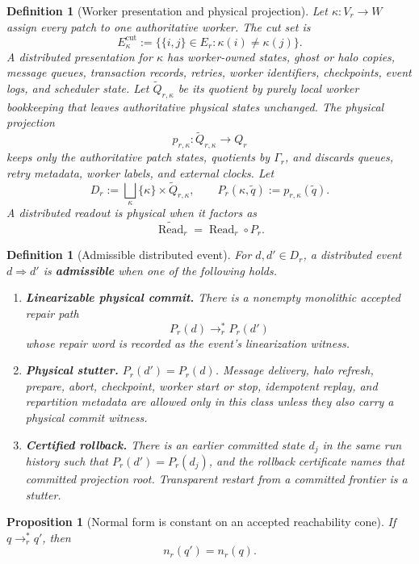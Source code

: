 \documentclass[11pt]{article}
\newtheorem{definition}[theorem]{Definition}
\newtheorem{proposition}[theorem]{Proposition}
\theoremstyle{remark}
\theoremstyle{plain}
\begin{document}
\begin{definition}[Worker presentation and physical projection]\label{def:worker-presentation}
Let \(\kappa:V_r\to W\) assign every patch to one authoritative worker. The cut set is
\[
E_\kappa^{\mathrm{cut}}
:=
\bigl\{\{i,j\}\in E_r:\kappa(i)\ne\kappa(j)\bigr\}.
\]
A distributed presentation for \(\kappa\) has worker-owned states, ghost or halo copies,
message queues, transaction records, retries, worker identifiers, checkpoints, event logs, and
scheduler state. Let \(\widetilde Q_{r,\kappa}\) be its quotient by purely local worker
bookkeeping that leaves authoritative physical states unchanged. The physical projection
\[
p_{r,\kappa}:\widetilde Q_{r,\kappa}\to Q_r
\]
keeps only the authoritative patch states, quotients by \(\Gamma_r\), and discards queues, retry
metadata, worker labels, and external clocks. Let
\[
D_r:=\bigsqcup_{\kappa}\{\kappa\}\times\widetilde Q_{r,\kappa},
\qquad
P_r(\kappa,\tilde q):=p_{r,\kappa}(\tilde q).
\]
A distributed readout is physical when it factors as
\[
\widetilde{\operatorname{Read}}_r=\operatorname{Read}_r\circ P_r.
\]
\end{definition}

\begin{definition}[Admissible distributed event]\label{def:admissible-distributed-event}
For \(d,d'\in D_r\), a distributed event \(d\Rightarrow d'\) is \textbf{admissible} when one of
the following holds.
\begin{enumerate}[label=(\alph*),leftmargin=2em]
\item \textbf{Linearizable physical commit.} There is a nonempty monolithic accepted repair path
\[
P_r(d)\to_r^*P_r(d')
\]
whose repair word is recorded as the event's linearization witness.
\item \textbf{Physical stutter.} \(P_r(d')=P_r(d)\). Message delivery, halo refresh, prepare,
abort, checkpoint, worker start or stop, idempotent replay, and repartition metadata are allowed
only in this class unless they also carry a physical commit witness.
\item \textbf{Certified rollback.} There is an earlier committed state \(d_j\) in the same run
history such that \(P_r(d')=P_r(d_j)\), and the rollback certificate names that committed
projection root. Transparent restart from a committed frontier is a stutter.
\end{enumerate}
\end{definition}

\begin{proposition}[Normal form is constant on an accepted reachability cone]\label{lem:nf-reachability-cone}
If \(q\to_r^*q'\), then
\[
n_r(q')=n_r(q).
\]
\end{proposition}
\end{document}

